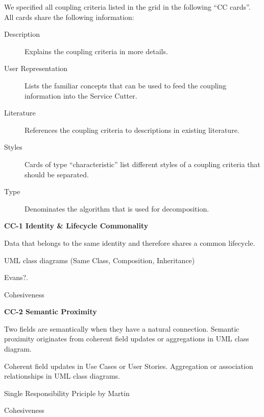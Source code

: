 We specified all coupling criteria listed in the grid in the following \enquote{CC cards}. All cards share the following information:

\begin{description}
\item[Description] Explains the coupling criteria in more details.
\item[User Representation] Lists the familiar concepts that can be used to feed the coupling information into the Service Cutter.
\item[Literature] References the coupling criteria to descriptions in existing literature.
\item[Styles] Cards of type \enquote{characteristic} list different styles of a coupling criteria that should be separated.
\item[Type] Denominates the algorithm that is used for decomposition. %
\end{description}

\newcommand{\ccCard}[7] {
\begin{minipage}{\linewidth}
	\begin{framed}
	\textbf{#1 #2}
	
		\begin{description}[leftmargin=!,labelwidth=\widthof{\bfseries User Representation}]
		\item[Description] #3
		\item[User Representation] #4 %
		\ifthenelse{\equal{#5}{}}{}{\item[Styles] #5}
		\item[Literature] #6
		\item[Type] #7
		\end{description}
	
	\end{framed}
\end{minipage}
}
\ccCard{CC-1}{Identity \& Lifecycle Commonality}{Data that belongs to the same identity and therefore shares a common lifecycle.}{UML class diagrams (Same Class, Composition, Inheritance)}{}{Evans?\cite{evans2003domain}.}{Cohesiveness}

\ccCard{CC-2}{Semantic Proximity}{Two fields are semantically when they have a natural connection. Semantic proximity originates from coherent field updates or aggregations in UML class diagram.}{Coherent field updates in Use Cases or User Stories. Aggregation or association relationships in UML class diagrams.}{}{Single Responsibility Priciple by Martin\cite{SRP}}{Cohesiveness}

